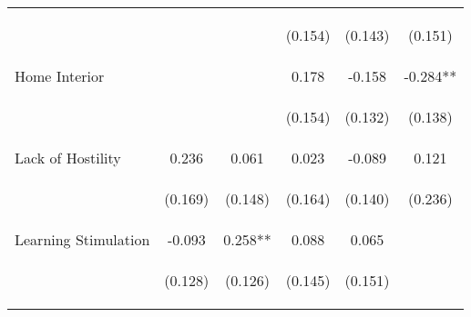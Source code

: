 \begin{tabular}{lccccc}
 & \begin{footnotesize}\end{footnotesize} & \begin{footnotesize}\end{footnotesize} & \begin{footnotesize}(0.154)\end{footnotesize} & \begin{footnotesize}(0.143)\end{footnotesize} & \begin{footnotesize}(0.151)\end{footnotesize}\\
\noalign{\smallskip}Home Interior &  &  & 0.178 & -0.158 & -0.284**\\
 & \begin{footnotesize}\end{footnotesize} & \begin{footnotesize}\end{footnotesize} & \begin{footnotesize}(0.154)\end{footnotesize} & \begin{footnotesize}(0.132)\end{footnotesize} & \begin{footnotesize}(0.138)\end{footnotesize}\\
\noalign{\smallskip}Lack of Hostility & 0.236 & 0.061 & 0.023 & -0.089 & 0.121\\
 & \begin{footnotesize}(0.169)\end{footnotesize} & \begin{footnotesize}(0.148)\end{footnotesize} & \begin{footnotesize}(0.164)\end{footnotesize} & \begin{footnotesize}(0.140)\end{footnotesize} & \begin{footnotesize}(0.236)\end{footnotesize}\\
\noalign{\smallskip}Learning Stimulation & -0.093 & 0.258** & 0.088 & 0.065 & \\
 & \begin{footnotesize}(0.128)\end{footnotesize} & \begin{footnotesize}(0.126)\end{footnotesize} & \begin{footnotesize}(0.145)\end{footnotesize} & \begin{footnotesize}(0.151)\end{footnotesize} & \begin{footnotesize}\end{footnotesize}\\

\end{tabular}
